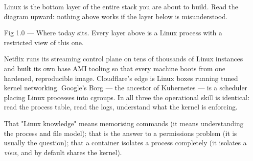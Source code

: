  Linux is the bottom layer of the entire stack you are about to build. Read the diagram upward: nothing above works if the layer below is misunderstood.

\begin{wbfigure}{Fig 1.0 — Where today sits. Every layer above is a Linux process with a restricted view of this one.}
\end{wbfigure}

 Netflix runs its streaming control plane on tens of thousands of Linux instances and built its own base AMI tooling so that every machine boots from one hardened, reproducible image. Cloudflare's edge is Linux boxes running tuned kernel networking. Google's Borg --- the ancestor of Kubernetes --- is a scheduler placing Linux processes into cgroups. In all three the operational skill is identical: read the process table, read the logs, understand what the kernel is enforcing.

 That "Linux knowledge" means memorising commands (it means understanding the process and file model); that  is the answer to a permissions problem (it is usually the question); that a container isolates a process completely (it isolates a \emph{view}, and by default shares the kernel).


